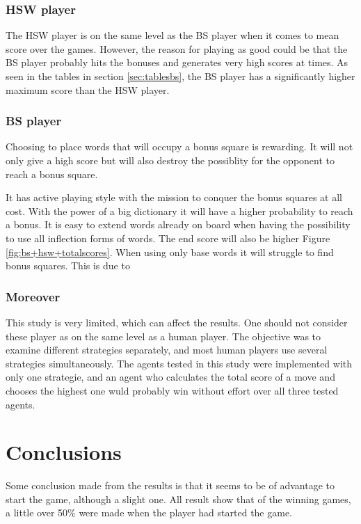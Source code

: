 \documentclass[a4paper, 12pt]{report}
\begin{document}
\subsubsection{HSW player}
The HSW player is on the same level as the BS player when it comes to mean score over the games. However, the reason for playing as good could be that the BS player probably hits the bonuses and generates very high scores at times. As seen in the tables in section \ref{sec:tablesbs}, the BS player has a significantly higher maximum score than the HSW player.

\subsubsection{BS player}
Choosing to place words that will occupy a bonus square is rewarding. It will not only give a high score but will also destroy the possiblity for the opponent to reach a bonus square.

It has active playing style with the mission to conquer the bonus squares at all cost. With the power of a big dictionary it will have a higher probability to reach a bonus. It is easy to extend words already on board when having the possibility to use all inflection forms of words. The end score will also be higher Figure \ref{fig:bs+hsw+totalscores}. When using only base words it will struggle to find bonus squares. This is due to 

\subsubsection{Moreover}
This study is very limited, which can affect the results. One should not consider these player as on the same level as a human player. The objective was to examine different strategies separately, and most human players use several strategies simultaneously. The agents tested in this study were implemented with only one strategie, and an agent who calculates the total score of a move and chooses the highest one wuld probably win without effort over all three tested agents. 

\section{Conclusions}
Some conclusion made from the results is that it seems to be of advantage to start the game, although a slight one. All result show that of the winning games, a little over 50\% were made when the player had started the game.
\end{document}
